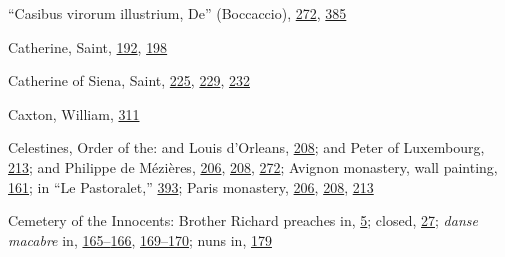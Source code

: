 ``Casibus virorum illustrium, De'' (Boccaccio),
\protect\hyperlink{18_Chapter_Eleven__THE_FORMS_OF_THO.xhtmlux5cux23page_272}{272},
\protect\hyperlink{22_Chapter_Fourteen__THE_COMING_OF.xhtmlux5cux23page_385}{385}

Catherine, Saint,
\protect\hyperlink{13_Chapter_Six__THE_DEPICTION_OF_TH.xhtmlux5cux23page_192}{192},
\protect\hyperlink{13_Chapter_Six__THE_DEPICTION_OF_TH.xhtmlux5cux23page_198}{198}

Catherine of Siena, Saint,
\protect\hyperlink{15_Chapter_Eight__RELIGIOUS_EXCITAT.xhtmlux5cux23page_225}{225},
\protect\hyperlink{15_Chapter_Eight__RELIGIOUS_EXCITAT.xhtmlux5cux23page_229}{229},
\protect\hyperlink{15_Chapter_Eight__RELIGIOUS_EXCITAT.xhtmlux5cux23page_232}{232}

Caxton, William,
\protect\hyperlink{20_ILLUSTRATIONS_FOLLOW_PAGE.xhtmlux5cux23page_311}{311}

Celestines, Order of the: and Louis d'Orleans,
\protect\hyperlink{14_Chapter_Seven__THE_PIOUS_PERSONA.xhtmlux5cux23page_208}{208};
and Peter of Luxembourg,
\protect\hyperlink{14_Chapter_Seven__THE_PIOUS_PERSONA.xhtmlux5cux23page_213}{213};
and Philippe de Mézières,
\protect\hyperlink{14_Chapter_Seven__THE_PIOUS_PERSONA.xhtmlux5cux23page_206}{206},
\protect\hyperlink{14_Chapter_Seven__THE_PIOUS_PERSONA.xhtmlux5cux23page_208}{208},
\protect\hyperlink{18_Chapter_Eleven__THE_FORMS_OF_THO.xhtmlux5cux23page_272}{272};
Avignon monastery, wall painting,
\protect\hyperlink{12_Chapter_Five__THE_VISION_OF_DEAT.xhtmlux5cux23page_161}{161};
in ``Le Pastoralet,''
\protect\hyperlink{22_Chapter_Fourteen__THE_COMING_OF.xhtmlux5cux23page_393}{393};
Paris monastery,
\protect\hyperlink{14_Chapter_Seven__THE_PIOUS_PERSONA.xhtmlux5cux23page_206}{206},
\protect\hyperlink{14_Chapter_Seven__THE_PIOUS_PERSONA.xhtmlux5cux23page_208}{208},
\protect\hyperlink{14_Chapter_Seven__THE_PIOUS_PERSONA.xhtmlux5cux23page_213}{213}

Cemetery of the Innocents: Brother Richard preaches in,
\protect\hyperlink{08_Chapter_One__THE_PASSIONATE_INTE.xhtmlux5cux23page_5}{5};
closed,
\protect\hyperlink{08_Chapter_One__THE_PASSIONATE_INTE.xhtmlux5cux23page_27}{27};
\emph{danse macabre} in,
\protect\hyperlink{12_Chapter_Five__THE_VISION_OF_DEAT.xhtmlux5cux23page_165}{165--}\protect\hyperlink{12_Chapter_Five__THE_VISION_OF_DEAT.xhtmlux5cux23page_166}{166},
\protect\hyperlink{12_Chapter_Five__THE_VISION_OF_DEAT.xhtmlux5cux23page_169}{169--}\protect\hyperlink{12_Chapter_Five__THE_VISION_OF_DEAT.xhtmlux5cux23page_170}{170};
nuns in,
\protect\hyperlink{13_Chapter_Six__THE_DEPICTION_OF_TH.xhtmlux5cux23page_179}{179}

